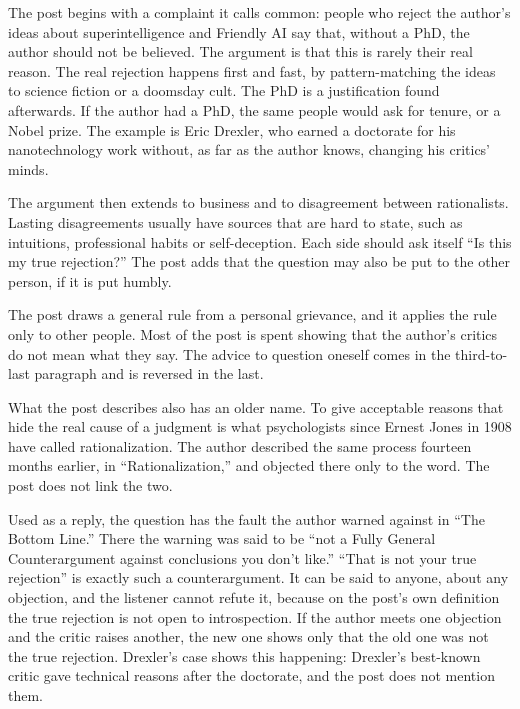 \begin{afterword}
\summaryhead

The post begins with a complaint it calls common: people who reject the author's ideas about superintelligence and Friendly AI say that, without a PhD, the author should not be believed. The argument is that this is rarely their real reason. The real rejection happens first and fast, by pattern-matching the ideas to science fiction or a doomsday cult. The PhD is a justification found afterwards. If the author had a PhD, the same people would ask for tenure, or a Nobel prize. The example is Eric Drexler, who earned a doctorate for his nanotechnology work without, as far as the author knows, changing his critics' minds.

The argument then extends to business and to disagreement between rationalists. Lasting disagreements usually have sources that are hard to state, such as intuitions, professional habits or self-deception. Each side should ask itself ``Is this my true rejection?'' The post adds that the question may also be put to the other person, if it is put humbly.

\responsehead

The post draws a general rule from a personal grievance, and it applies the rule only to other people. Most of the post is spent showing that the author's critics do not mean what they say. The advice to question oneself comes in the third-to-last paragraph and is reversed in the last.

What the post describes also has an older name. To give acceptable reasons that hide the real cause of a judgment is what psychologists since Ernest Jones in 1908 have called rationalization. The author described the same process fourteen months earlier, in ``Rationalization,'' and objected there only to the word. The post does not link the two.

Used as a reply, the question has the fault the author warned against in ``The Bottom Line.'' There the warning was said to be ``not a Fully General Counterargument against conclusions you don't like.'' ``That is not your true rejection'' is exactly such a counterargument. It can be said to anyone, about any objection, and the listener cannot refute it, because on the post's own definition the true rejection is not open to introspection. If the author meets one objection and the critic raises another, the new one shows only that the old one was not the true rejection. Drexler's case shows this happening: Drexler's best-known critic gave technical reasons after the doctorate, and the post does not mention them.


\end{afterword}
